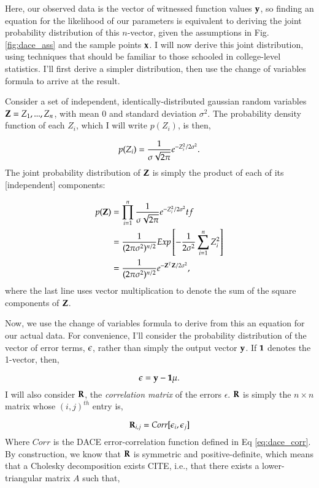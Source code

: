 Here, our observed data is the vector of witnessed function values $\mathbf{y}$, so finding an equation for the likelihood of our parameters is equivalent to deriving the joint probability distribution of this $n$-vector, given the assumptions in Fig. \ref{fig:dace_ass} and the sample points $\mathbf{x}$. I will now derive this joint distribution, using techniques that should be familiar to those schooled in college-level statistics. I'll first derive a simpler distribution, then use the change of variables formula to arrive at the result.

Consider a set of independent, identically-distributed gaussian random variables $\mathbf{Z} = Z_1,...,Z_n$, with mean 0 and standard deviation $\sigma^2$. The probability density function of each $Z_i$, which I will write $p(Z_i)$, is then,

\begin{equation} \label{eq:f_{Z_i}}
p(Z_i)=\frac{1}{\sigma\sqrt{2\pi}}e^{-Z_i^2/2\sigma^2}.
\end{equation}
The joint probability distribution of $\mathbf{Z}$ is simply the product of each of its [independent] components:

\begin{align}  \label{eq:F_Z}
p(\mathbf{Z}) &= \prod_{i=1}^n \frac{1}{\sigma\sqrt{2\pi}}e^{-Z_i^2/2\sigma^2}tf  \\
			 &= \frac{1}{(2\pi\sigma^2)^{n/2}} {E}xp\left [ -\frac{1}{2\sigma^2}\sum_{i=1}^{n} Z_i^2\right ] \nonumber\\
			 &= \frac{1}{(2\pi\sigma^2)^{n/2}} e^{-\mathbf{Z}^T\mathbf{Z}/2\sigma^2},\nonumber
\end{align}
where the last line uses vector multiplication to denote the sum of the square components of $\mathbf{Z}$.

Now, we use the change of variables formula to derive from this an equation for our actual data. For convenience, I'll consider the probability distribution of the vector of error terms, $\mathbf{\epsilon}$, rather than simply the output vector $\mathbf{y}$. If $\mathbf{1}$ denotes the 1-vector, then,

\begin{equation}\label{eq:epsilon}
\epsilon = \mathbf{y} - \mathbf{1}\mu.
\end{equation}
I will also consider $\mathbf{R}$, the \emph{correlation matrix} of the errors $\epsilon$. $\mathbf{R}$ is simply the $n\times n$ matrix whose $(i,j)^{th}$ entry is, 

\begin{equation}\label{eq:R}
\mathbf{R}_{i,j}=Corr[\epsilon_i,\epsilon_j]
\end{equation}
Where $Corr$ is the DACE error-correlation function defined in Eq \ref{eq:dace_corr}. By construction, we know that $\mathbf{R}$ is symmetric and positive-definite, which means that a Cholesky decomposition exists CITE\cite{linear_algebra}, i.e., that there exists a lower-triangular matrix $A$ such that,


